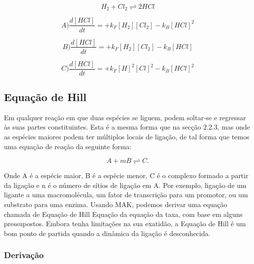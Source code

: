 \documentclass[11pt, letterpaper, portuguese]{article}
\begin{document}
    \begin{equation}
        H_2+{Cl}_2 \rightleftharpoons 2HCl
    \end{equation}
    
    \vspace{2 cm}
    
    \begin{equation}
        A)\frac{d [HCl]}{d t}=+k_F[H_2][{Cl}_2]-k_B[HCl]^2
    \end{equation}

    \begin{equation}
        B)\frac{d [HCl]}{d t}=+k_F[H_2][{Cl}_2]-k_B[HCl]
    \end{equation}

    \begin{equation}
        C)\frac{d [HCl]}{d t}=+k_F{[H]}^2{[Cl]}^2-k_B[HCl]^2
    \end{equation}
    
    
\subsection{Equação de Hill}
    
\par{Em qualquer reação em que duas espécies se liguem, podem soltar-se e regressar às suas partes constituintes. Esta é a mesma forma que na secção 2.2.3, mas onde as espécies maiores podem ter múltiplos locais de ligação, de tal forma que temos uma equação de reação da seguinte forma:}
    
\begin{equation}
    A+mB \rightleftharpoons C.
\end{equation}
\par{Onde A é a espécie maior, B é a espécie menor, C é o complexo formado a partir da ligação e n é o número de sítios de ligação em A. Por exemplo, ligação de um ligante a uma macromolécula, um fator de transcrição para um promotor, ou um substrato para uma enzima. Usando MAK, podemos derivar uma equação chamada de Equação de Hill Equação da equação da taxa, com base em alguns pressupostos. Embora tenha limitações na sua exatidão, a Equação de Hill é um bom ponto de partida quando a dinâmica da ligação é desconhecida.}
    
    \subsubsection{Derivação}
    
\end{document}

